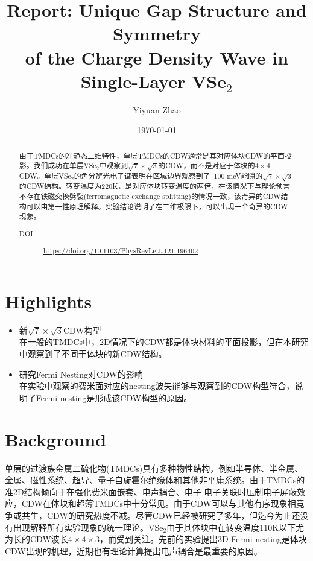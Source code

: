 \documentclass[reprint, aps, prb, showkeys]{revtex4-2}
\begin{document}
\title{Report: Unique Gap Structure and Symmetry \\
of the Charge Density Wave in Single-Layer VSe$_2$}

\author{Yiyuan Zhao}
\date{\today}

\begin{abstract}
由于TMDCs的准静态二维特性，单层TMDCs的CDW通常是其对应体块CDW的平面投影。我们成功在单层VSe$_2$中观察到$\sqrt{7} \times \sqrt{3}$的CDW，而不是对应于体块的$4 \times 4$CDW。单层VSe$_2$的角分辨光电子谱表明在区域边界观察到了~100 meV能隙的$\sqrt{7} \times \sqrt{3}$的CDW结构。转变温度为220K，是对应体块转变温度的两倍，在该情况下与理论预言不存在铁磁交换劈裂(ferromagnetic exchange splitting)的情况一致，该奇异的CDW结构可以由第一性原理解释。实验结论说明了在二维极限下，可以出现一个奇异的CDW现象。
\begin{description}
    \item[DOI] \url{https://doi.org/10.1103/PhysRevLett.121.196402}
\end{description}
\end{abstract}


\maketitle
\section{Highlights}
\begin{itemize}
    \item 新$\sqrt{7} \times \sqrt{3}$CDW构型 \\
    在一般的TMDCs中，2D情况下的CDW都是体块材料的平面投影，但在本研究中观察到了不同于体块的新CDW结构。
    \item 研究Fermi Nesting对CDW的影响 \\
    在实验中观察的费米面对应的nesting波矢能够与观察到的CDW构型符合，说明了Fermi nesting是形成该CDW构型的原因。
\end{itemize}


\section{Background}
单层的过渡族金属二硫化物(TMDCs)具有多种物性结构，例如半导体、半金属、金属、磁性系统、超导、量子自旋霍尔绝缘体和其他非平庸系统。由于TMDCs的准2D结构倾向于在强化费米面嵌套、电声耦合、电子-电子关联时压制电子屏蔽效应，CDW在体块和超薄TMDCs中十分常见。由于CDW可以与其他有序现象相竞争或共生，CDW的研究热度不减。尽管CDW已经被研究了多年，但迄今为止还没有出现解释所有实验现象的统一理论。VSe$_2$由于其体块中在转变温度110K以下尤为长的CDW波长$4 \times 4 \times 3$，而受到关注。先前的实验提出3D Fermi nesting是体块CDW出现的机理，近期也有理论计算提出电声耦合是最重要的原因。
\end{document}
